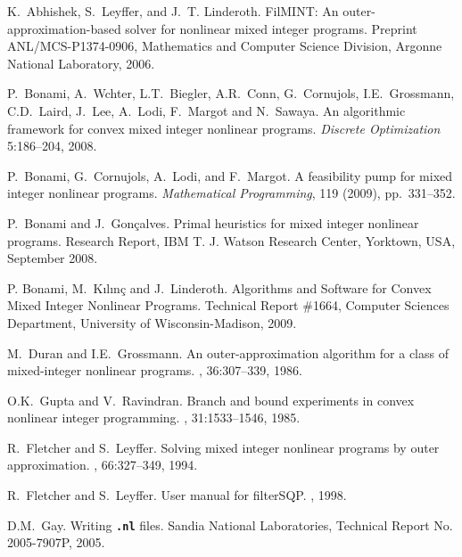 \begin{PageSummary}
\end{PageSummary}
\begin{thebibliography}{10}

 K.~Abhishek, S.~Leyffer, and J.~T. Linderoth. {FilMINT}: {An}
  outer-approximation-based solver for nonlinear mixed integer programs.
  Preprint ANL/MCS-P1374-0906, Mathematics and Computer Science Division,
  Argonne National Laboratory, 2006.

P.~Bonami, A.~W\auml chter, L.T.~Biegler, A.R.~Conn, G.~Cornu\eacute jols,
I.E.~Grossmann, C.D.~Laird, J.~Lee, A.~Lodi, F.~Margot and
N.~Sawaya.
\newblock An algorithmic framework for convex mixed integer nonlinear programs. {\em Discrete Optimization} 5:186--204, 2008.

{P.~Bonami, G.~Cornu\eacute jols, A.~Lodi, and F.~Margot}. {A feasibility
  pump for mixed integer nonlinear programs}. {\em Mathematical Programming}, 119
  (2009), pp.~331--352.

{P.~Bonami and J.~Gon{\c{c}}alves}. {Primal heuristics for mixed
  integer nonlinear programs}. Research Report, IBM T. J. Watson Research
  Center, Yorktown, USA, September 2008.

P. Bonami, M.~{K{\i}l{\i}n\c{c}} and J.~Linderoth.
Algorithms and Software for Convex Mixed Integer Nonlinear Programs.
Technical Report \#1664, Computer Sciences Department, University of
Wisconsin-Madison, 2009.

M.~Duran and I.E.~Grossmann.
\newblock An outer-approximation algorithm for a class of mixed-integer nonlinear programs.
, 36:307--339, 1986.

O.K.~Gupta and V.~Ravindran.
\newblock Branch and bound experiments in convex nonlinear integer programming.
, 31:1533--1546, 1985.

R.~Fletcher and S.~Leyffer.
\newblock Solving mixed integer nonlinear programs by outer approximation.
, 66:327--349, 1994.

R.~Fletcher and S.~Leyffer.
\newblock User manual for filter{SQP}.
, 1998.

D.M.~Gay.
\newblock Writing \texttt{\bf .nl} files.
\newblock Sandia National Laboratories, Technical Report No. 2005-7907P, 2005.


\end{thebibliography}
